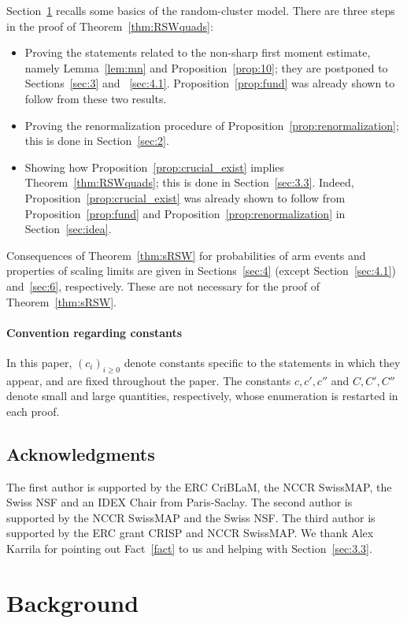 \documentclass[a4paper,oneside,11pt]{article}
\numberwithin{equation}{section}
\numberwithin{equation}{section}
\numberwithin{equation}{section}
\begin{document}
Section~\ref{sec:background} recalls some basics of the random-cluster model. 
There are three steps in the proof of Theorem~\ref{thm:RSWquads}:
\begin{itemize}
\item Proving the statements related to the non-sharp first moment estimate, namely Lemma~\ref{lem:mn} and Proposition~\ref{prop:10};
they are postponed to Sections~\ref{sec:3} and ~\ref{sec:4.1}. 
Proposition~\ref{prop:fund} was already shown to follow from these two results. 
\item Proving the renormalization procedure of Proposition~\ref{prop:renormalization}; this is done in Section~\ref{sec:2}.
\item Showing how Proposition~\ref{prop:crucial_exist} implies Theorem~\ref{thm:RSWquads}; this is done in Section~\ref{sec:3.3}.
Indeed, Proposition~\ref{prop:crucial_exist} was already shown to follow from Proposition~\ref{prop:fund} and Proposition~\ref{prop:renormalization} in Section~\ref{sec:idea}.
\end{itemize} 
Consequences of Theorem~\ref{thm:sRSW} for probabilities of arm events and properties of scaling limits are given in Sections~\ref{sec:4} (except Section~\ref{sec:4.1}) and~\ref{sec:6}, respectively. These are not necessary for the proof of Theorem~\ref{thm:sRSW}.





\paragraph{Convention regarding constants}
In this paper, $(c_i)_{i\geq0}$ denote constants specific to the statements in which they appear, and are fixed throughout the paper. 
The constants $c,c',c''$ and $C,C',C''$ denote small and large quantities, respectively, whose enumeration is restarted in each proof.


\subsection{Acknowledgments} 
The first author is supported by the ERC CriBLaM, the NCCR SwissMAP, the Swiss NSF and an IDEX Chair from Paris-Saclay. The second author is supported by the NCCR SwissMAP and the Swiss NSF. The third author is supported by the ERC grant CRISP and NCCR SwissMAP. We thank Alex Karrila for pointing out Fact~\ref{fact} to us and helping with Section~\ref{sec:3.3}.
\section{Background}\label{sec:background}
\end{document}
